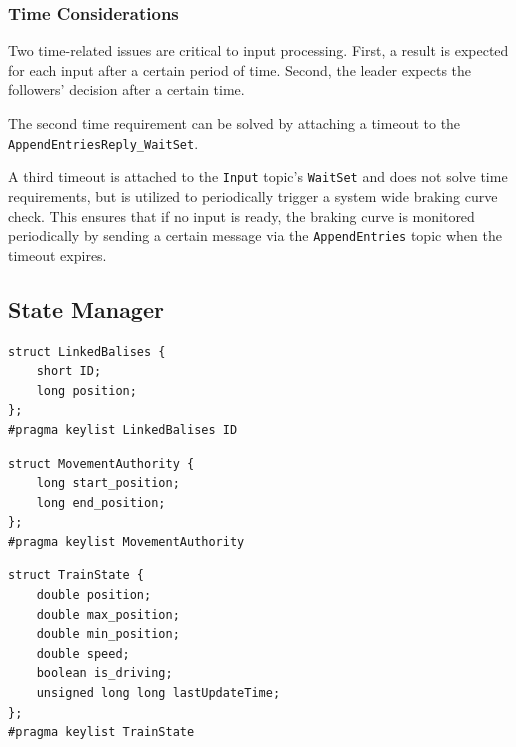 \subsubsection{Time Considerations}
Two time-related issues are critical to input processing.
First, a result is expected for each input after a certain period of time.
Second, the leader expects the followers' decision after a certain time.

The second time requirement can be solved by attaching a timeout to the \texttt{AppendEntriesReply\_WaitSet}.

A third timeout is attached to the \texttt{Input} topic's \texttt{WaitSet} and does not solve time requirements, but is utilized to periodically trigger a system wide braking curve check.
This ensures that if no input is ready, the braking curve is monitored periodically by sending a certain message via the \texttt{AppendEntries} topic when the timeout expires.

\subsection{State Manager}

\begin{lstlisting}[caption={\abr{IDL} definition for the \texttt{LinkedBalises} topic. Each linked balise has an unique identifier and a position that is communicated to the system by the \abr{RBC}.}, label=code:linkedBalises]
struct LinkedBalises {
    short ID;
    long position;
};
#pragma keylist LinkedBalises ID
\end{lstlisting}

\begin{lstlisting}[caption={\abr{IDL} definition for the \texttt{MovementAuthority} topic. The \texttt{start\_position} encodes where the \abr{MA} starts and the \texttt{end\_position} encodes until where it is valid.}, label=code:movementAuthority]
struct MovementAuthority {
    long start_position;
    long end_position;
};
#pragma keylist MovementAuthority
\end{lstlisting}

\begin{lstlisting}[caption={\abr{IDL} definition for the \texttt{TrainState} topic. The train's state consists of a current position and a current speed. Due to inaccuracies of the position sensors, a train's position cannot be determined exactly. Therefore, a confidence interval is maintained that defines an area where the train certainly is. This area is bounded by \texttt{max\_position} and \texttt{min\_position}. With \texttt{is\_driving} it is encoded whether the virtual train drives or stands still. The \texttt{lastUpdateTime} variable is used to simulate the train's position based on its speed.}, label=code:trainState]
struct TrainState {
    double position;
    double max_position;
    double min_position;
    double speed;
    boolean is_driving;
    unsigned long long lastUpdateTime;
};
#pragma keylist TrainState
\end{lstlisting}

